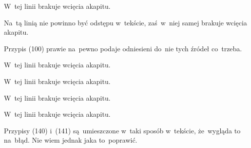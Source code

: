 \documentclass[a4paper,11pt]{article}
\begin{document}
\vspace{\spaceFour}





\noindent
{} W~tej linii brakuje wcięcia akapitu.

\vspace{\spaceFour}





\noindent
{} Na~tą linią nie powinno być odstępu w~tekście, zaś~w~niej
samej brakuje wcięcia akapitu.

\vspace{\spaceFour}





\noindent
{} Przypis (100) prawie na~pewno podaje odniesieni do~nie tych
źródeł co~trzeba.

\vspace{\spaceFour}





\noindent
{} W~tej linii brakuje wcięcia akapitu.

\vspace{\spaceFour}





\noindent
{} W~tej linii brakuje wcięcia akapitu.

\vspace{\spaceFour}





\noindent
{} W~tej linii brakuje wcięcia akapitu.

\vspace{\spaceFour}





\noindent
{} W~tej linii brakuje wcięcia akapitu.

\vspace{\spaceFour}





\noindent
{} Przypisy (140) i~(141) są~umieszczone w~taki sposób w~tekście,
że~wygląda to na~błąd. Nie wiem jednak jaka to~poprawić.

\vspace{\spaceFour}
\end{document}
